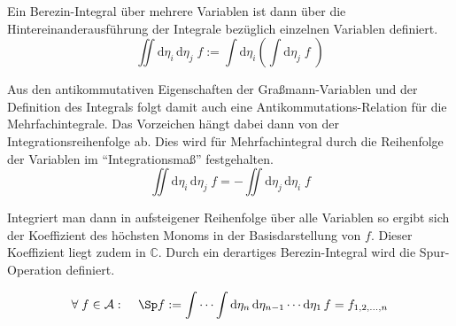 \noindent Ein Berezin-Integral über mehrere Variablen ist dann über die Hintereinanderausführung der Integrale bezüglich einzelnen Variablen definiert. 
\begin{equation}
\iint \mathrm{d} \eta_{i}\, \mathrm{d} \eta_{j}\; f := \int \mathrm{d} \eta_{i} \left( \int \mathrm{d} \eta_{j}\; f\; \right)
\end{equation}

\noindent Aus den antikommutativen Eigenschaften der Graßmann-Variablen und der Definition des Integrals folgt damit auch eine Antikommutations-Relation für die Mehrfachintegrale. Das Vorzeichen hängt dabei dann von der Integrationsreihenfolge ab. Dies wird für Mehrfachintegral durch die Reihenfolge der Variablen im ``Integrationsmaß'' festgehalten.
\begin{equation}
\iint \mathrm{d} \eta_{i}\, \mathrm{d} \eta_{j}\; f = - \iint \mathrm{d} \eta_{j}\, \mathrm{d}\eta_{i}\; f
\end{equation}

\noindent Integriert man dann in aufsteigener Reihenfolge über alle Variablen so ergibt sich der Koeffizient des höchsten Monoms in der Basisdarstellung von $f$. Dieser Koeffizient liegt zudem in $\mathbb C$. Durch ein derartiges Berezin-Integral wird die Spur-Operation definiert. 
\begin{grayframe}[frametitle = {Definition: Spur-Operation}]
    \begin{equation} \label{def: GraßmannSpur}
        \forall \;f\in \mathcal A : \;\;\;\; \Sp f := \int \cdots \int \mathrm{d}\eta_n\,\mathrm{d}\eta_{n-1}\cdots \mathrm{d}\eta_1\, f = f_{1,2,\dots,n}
    \end{equation}
\end{grayframe}

